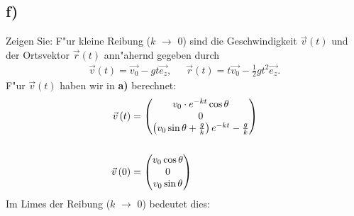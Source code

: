\documentclass{theozettel}
\begin{document}
\subsection*{f)}Zeigen Sie: F"ur kleine Reibung ($k$ $\rightarrow$ 0) sind die Geschwindigkeit $\vec{v}\left(t\right)$ und der Ortsvektor $\vec{r}\left(t\right)$ ann"ahernd gegeben durch
\begin{align*}
\vec{v}\left(t\right)=\vec{v_0}-gt\vec{e_z}\text{,}&&\vec{r}\left(t\right)=t\vec{v_0}-\frac{1}{2}gt^2\vec{e_z}\text{.}
\end{align*}
F"ur $\vec{v}\left(t\right)$ haben wir in \textbf{a)} berechnet:
\begin{align*}
\vec{v}\left(t\right)&=\mqty(v_0\cdot e^{-kt}\cos\theta\\0\\\left(v_0\sin\theta+\frac{g}{k}\right)e^{-kt}-\frac{g}{k})\\\\
\vec{v}\left(0\right)&=\mqty(v_0\cos\theta\\0\\v_0\sin\theta)
\end{align*}
Im Limes der Reibung ($k$ $\rightarrow$ 0) bedeutet dies:
\end{document}
